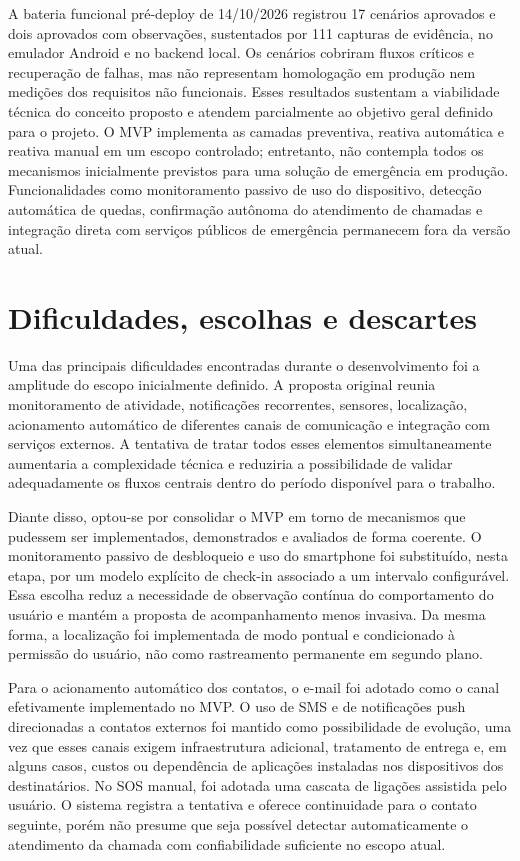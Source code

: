 A bateria funcional pré-deploy de 14/10/2026 registrou 17 cenários aprovados e dois aprovados com observações, sustentados por 111 capturas de evidência, no emulador Android e no backend local. Os cenários cobriram fluxos críticos e recuperação de falhas, mas não representam homologação em produção nem medições dos requisitos não funcionais. Esses resultados sustentam a viabilidade técnica do conceito proposto e atendem parcialmente ao objetivo geral definido para o projeto. O MVP implementa as camadas preventiva, reativa automática e reativa manual em um escopo controlado; entretanto, não contempla todos os mecanismos inicialmente previstos para uma solução de emergência em produção. Funcionalidades como monitoramento passivo de uso do dispositivo, detecção automática de quedas, confirmação autônoma do atendimento de chamadas e integração direta com serviços públicos de emergência permanecem fora da versão atual.

\section{Dificuldades, escolhas e descartes}

Uma das principais dificuldades encontradas durante o desenvolvimento foi a amplitude do escopo inicialmente definido. A proposta original reunia monitoramento de atividade, notificações recorrentes, sensores, localização, acionamento automático de diferentes canais de comunicação e integração com serviços externos. A tentativa de tratar todos esses elementos simultaneamente aumentaria a complexidade técnica e reduziria a possibilidade de validar adequadamente os fluxos centrais dentro do período disponível para o trabalho.

Diante disso, optou-se por consolidar o MVP em torno de mecanismos que pudessem ser implementados, demonstrados e avaliados de forma coerente. O monitoramento passivo de desbloqueio e uso do smartphone foi substituído, nesta etapa, por um modelo explícito de check-in associado a um intervalo configurável. Essa escolha reduz a necessidade de observação contínua do comportamento do usuário e mantém a proposta de acompanhamento menos invasiva. Da mesma forma, a localização foi implementada de modo pontual e condicionado à permissão do usuário, não como rastreamento permanente em segundo plano.

Para o acionamento automático dos contatos, o e-mail foi adotado como o canal efetivamente implementado no MVP. O uso de SMS e de notificações push direcionadas a contatos externos foi mantido como possibilidade de evolução, uma vez que esses canais exigem infraestrutura adicional, tratamento de entrega e, em alguns casos, custos ou dependência de aplicações instaladas nos dispositivos dos destinatários. No SOS manual, foi adotada uma cascata de ligações assistida pelo usuário. O sistema registra a tentativa e oferece continuidade para o contato seguinte, porém não presume que seja possível detectar automaticamente o atendimento da chamada com confiabilidade suficiente no escopo atual.

